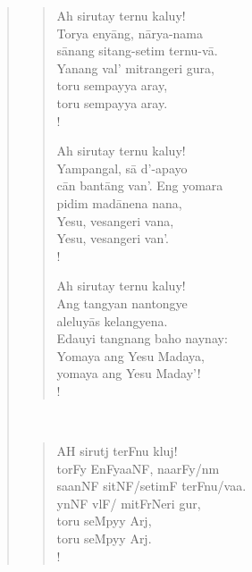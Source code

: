 \documentclass[12pt,paper=a4]{scrartcl}
\begin{document}
\begin{quote}
\begin{minipage}[t]{.5\linewidth}
\begin{verse}
\renewcommand*{\vrightskip}{-2em}
\verselinenumbersleft
{}
\begin{patverse}
Ah sirutay ternu kaluy!\\
Torya enyāng, nārya-nama\\
sānang sitang-setim ternu-vā.\\
Yanang val' mitrangeri gura,\\
toru sempayya aray,\\
toru sempayya aray.\\!
\end{patverse}

\begin{patverse}
Ah sirutay ternu kaluy!\\
Yampangal, sā d'-apayo\\
cān bantāng van'. Eng yomara\\
pidim madānena nana,\\
Yesu, vesangeri vana,\\
Yesu, vesangeri van'.\\!
\end{patverse}

\begin{patverse}
Ah sirutay ternu kaluy!\\
Ang tangyan nantongye\\
aleluyās kelangyena.\\
Edauyi tangnang baho naynay:\\
Yomaya ang Yesu Madaya,\\
yomaya ang Yesu Maday'!\\!
\end{patverse}
\end{verse}
\end{minipage}
~
\begin{minipage}[t]{.5\linewidth}
\Tagati %
\begin{verse}
\begin{patverse}
AH sirutj terFnu kluj!\\
torFy EnFyaaNF, naarFy/nm\\
saanNF sitNF/setimF terFnu/vaa.\\
ynNF vlF/ mitFrNeri gur,\\
toru seMpyy Arj,\\
toru seMpyy Arj.\\!
\end{patverse}


\end{verse}
\end{minipage}
\end{quote}
\end{document}

